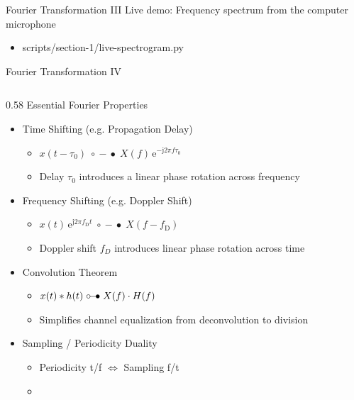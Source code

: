 \begin{frame}{Fourier Transformation III}
  \centering
  Live demo: Frequency spectrum from the computer microphone
  \begin{itemize}
    \item scripts/section-1/live-spectrogram.py
  \end{itemize}
\end{frame}

\begin{frame}{Fourier Transformation IV}
  \begin{columns}[T,onlytextwidth]
    \begin{column}{0.58\textwidth}
      Essential Fourier Properties\\
      \begin{itemize}
        \item Time Shifting (e.g. Propagation Delay)
          \begin{itemize}
            \item $x(t - \tau_0) \;\circ\!\!-\!\!\bullet\; X(f) \,\mathrm{e}^{-\mathrm{j} 2\pi f \tau_0}$
            \item Delay $\tau_0$ introduces a linear phase rotation across frequency
          \end{itemize}
        \item Frequency Shifting (e.g. Doppler Shift)
          \begin{itemize}
            \item $x(t) \,\mathrm{e}^{\mathrm{j} 2\pi f_\mathrm{D} t} \;\circ\!\!-\!\!\bullet\; X(f - f_\mathrm{D})$
            \item Doppler shift $f_D$ introduces linear phase rotation across time
          \end{itemize}
        \item Convolution Theorem
          \begin{itemize}
            \item $x(t) * h(t) \mathrel{\circ}\mathrel{\!}\mathrel{-}\mathrel{\!}\mathrel{\bullet} X(f) \cdot H(f)$
            \item Simplifies channel equalization from deconvolution to division
          \end{itemize}
        \item Sampling / Periodicity Duality
          \begin{itemize}
            \item Periodicity t/f $\Longleftrightarrow$ Sampling f/t
            \item {}
          \end{itemize}
      \end{itemize}
    \end{column}


\end{columns}
\end{frame}
